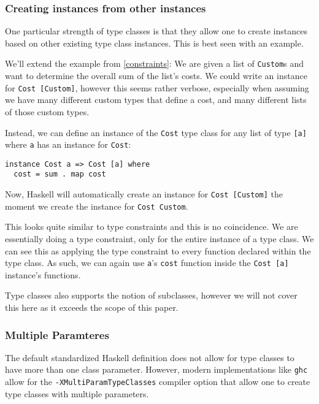 \subsubsection{Creating instances from other instances}

One particular strength of type classes is that they allow one to create instances based on other existing type class instances. This is best seen with an example.

We'll extend the example from \ref{constraints}:
We are given a list of \verb|Custom|s and want to determine the overall sum of the list's costs. We could write an instance for \verb|Cost [Custom]|, however this seems rather verbose, especially when assuming we have many different custom types that define a cost, and many different lists of those custom types.

Instead, we can define an instance of the \verb|Cost| type class for any list of type \verb|[a]| where \verb|a| has an instance for \verb|Cost|:
\begin{verbatim}
instance Cost a => Cost [a] where
  cost = sum . map cost
\end{verbatim}
Now, Haskell will automatically create an instance for \verb|Cost [Custom]| the moment we create the instance for \verb|Cost Custom|.

This looks quite similar to type constraints and this is no coincidence. We are essentially doing a type constraint, only for the entire instance of a type class. We can see this as applying the type constraint to every function declared within the type class. As such, we can again use \verb|a|'s \verb|cost| function inside the \verb|Cost [a]| instance's functions.


Type classes also supports the notion of subclasses, however we will not cover this here as it exceeds the scope of this paper.

\subsubsection{Multiple Paramteres}

The default standardized Haskell definition does not allow for type classes to have more than one class parameter. However, modern implementations like \verb|ghc| allow for the \verb|-XMultiParamTypeClasses| compiler option that allow one to create type classes with multiple parameters.

